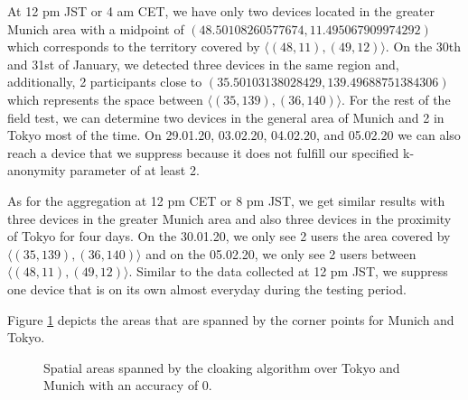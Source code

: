 At 12 pm JST or 4 am CET, we have only two devices located in the greater Munich area with a midpoint of \((48.50108260577674, 11.495067909974292)\) which corresponds to the territory covered by \(\langle(48, 11),(49, 12)\rangle\). On the 30th and 31st of January, we detected three devices in the same region and, additionally, 2 participants close to \((35.50103138028429, 139.49688751384306)\) which represents the space between \(\langle(35, 139),(36, 140)\rangle\). For the rest of the field test, we can determine two devices in the general area of Munich and 2 in Tokyo most of the time. On 29.01.20, 03.02.20, 04.02.20, and 05.02.20 we can also reach a device that we suppress because it does not fulfill our specified k-anonymity parameter of at least 2.

As for the aggregation at 12 pm CET or 8 pm JST, we get similar results with three devices in the greater Munich area and also three devices in the proximity of Tokyo for four days. On the 30.01.20, we only see 2 users the area covered by \(\langle(35, 139),(36, 140)\rangle\) and on the 05.02.20, we only see 2 users between \(\langle(48, 11),(49, 12)\rangle\). Similar to the data collected at 12 pm JST, we suppress one device that is on its own almost everyday during the testing period.

Figure \ref{fig:acc0} depicts the areas that are spanned by the corner points for Munich and Tokyo. 

\begin{figure}[htbp]
  \centering
  \hfill
  \caption{Spatial areas spanned by the cloaking algorithm over Tokyo and Munich with an accuracy of 0.}
  \label{fig:acc0}
\end{figure}


